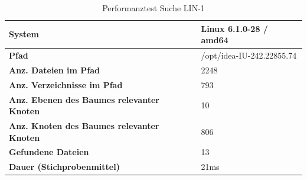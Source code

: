 \documentclass[a4paper,12pt]{report}
\begin{document}
    \begin{table}[h!]
        \centering
        \setlength{\leftmargini}{0.8cm}
        \begin{tabular}{|p{7cm}|p{5cm}|}
            \hline
            \textbf{System}                                            & Linux 6.1.0-28 / amd64    \\ \hline
            \textbf{Pfad}                                              & /opt/idea-IU-242.22855.74 \\ \hline
            \textbf{Anz. Dateien im Pfad}                              & 2248                      \\ \hline
            \textbf{Anz. Verzeichnisse im Pfad}                        & 793                       \\ \hline
            \textbf{Anz. Ebenen \newline des Baumes relevanter Knoten} & 10                        \\ \hline
            \textbf{Anz. Knoten \newline des Baumes relevanter Knoten} & 806                       \\ \hline
            \textbf{Gefundene Dateien}                                 & 13                        \\ \hline
            \textbf{Dauer (Stichprobenmittel)}                        & 21ms                      \\ \hline
        \end{tabular}
        \caption{Performanztest Suche LIN-1}\label{tab:perf-search-lin-1}
    \end{table}
\end{document}
